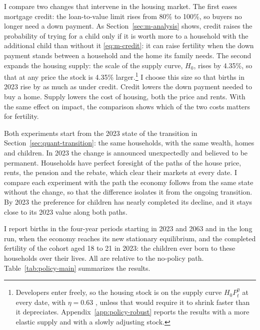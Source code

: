 I compare two changes that intervene in the housing market. The first eases
mortgage credit: the loan-to-value limit rises from 80\% to 100\%, so buyers no
longer need a down payment. As Section~\ref{sec:m-analysis} shows, credit
raises the probability of trying for a child only if it is worth more to a
household with the additional child than without it \eqref{eq:m-credit}: it
can raise fertility when the down payment stands between a household and the
home its family needs. The second expands the housing supply: the scale of
the supply curve, $H_0$, rises by 4.35\%, so that at any price the stock
is 4.35\% larger.\footnote{Developers enter freely, so the housing stock is on the
supply curve $H_0P_t^{\eta}$ at every date, with $\eta=0.63$
\citep{baum-snowMicrogeographyHousingSupply2024}, unless that would require it
to shrink faster than it depreciates. Appendix~\ref{app:policy-robust} reports
the results with a more elastic supply and with a slowly adjusting stock.} I choose this size so that births in 2023 rise by as
much as under credit. Credit lowers the down payment needed to buy a home.
Supply lowers the cost of housing, both the price and rents. With the same
effect on impact, the comparison shows which of the two costs matters for
fertility.

Both experiments start from the 2023 state of the transition in
Section~\ref{sec:quant-transition}: the same households, with the same
wealth, homes and children. In 2023 the change is announced unexpectedly and
believed to be permanent. Households have perfect foresight of the paths of
the house price, rents, the pension and the rebate, which clear their markets
at every date. I compare each experiment with the path the economy follows from
the same state without the change, so that the difference isolates it from
the ongoing transition. By 2023 the preference for children has nearly
completed its decline, and it stays close to its 2023 value along both paths.

I report births in the four-year periods starting in 2023 and 2063 and in the
long run, when the economy reaches its new stationary equilibrium, and the
completed fertility of the cohort aged 18 to 21 in 2023: the children ever
born to these households over their lives. All are relative to the no-policy
path. Table~\ref{tab:policy-main} summarizes the results.

